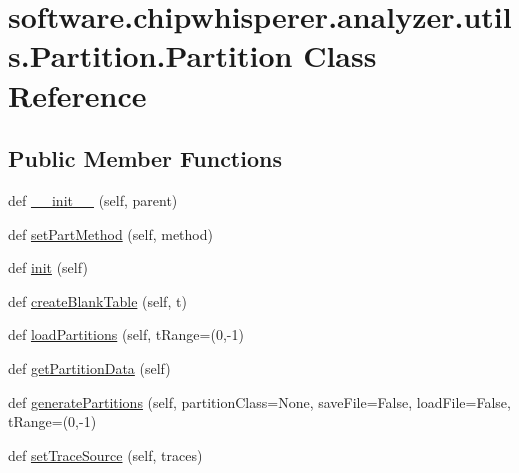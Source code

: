 \hypertarget{classsoftware_1_1chipwhisperer_1_1analyzer_1_1utils_1_1Partition_1_1Partition}{}\section{software.\+chipwhisperer.\+analyzer.\+utils.\+Partition.\+Partition Class Reference}
\label{classsoftware_1_1chipwhisperer_1_1analyzer_1_1utils_1_1Partition_1_1Partition}
\subsection*{Public Member Functions}
\begin{DoxyCompactItemize}
\item 
def \hyperlink{classsoftware_1_1chipwhisperer_1_1analyzer_1_1utils_1_1Partition_1_1Partition_a55aa100e00d71c01c67099e41a0db41f}{\+\_\+\+\_\+init\+\_\+\+\_\+} (self, parent)
\item 
def \hyperlink{classsoftware_1_1chipwhisperer_1_1analyzer_1_1utils_1_1Partition_1_1Partition_ae704605c5cab887f0353518d0b1f4310}{set\+Part\+Method} (self, method)
\item 
def \hyperlink{classsoftware_1_1chipwhisperer_1_1analyzer_1_1utils_1_1Partition_1_1Partition_aeea2c891f787b358435a22db73a3e71b}{init} (self)
\item 
def \hyperlink{classsoftware_1_1chipwhisperer_1_1analyzer_1_1utils_1_1Partition_1_1Partition_ab1059540a7484b4cb1d38568aac9a4ce}{create\+Blank\+Table} (self, t)
\item 
def \hyperlink{classsoftware_1_1chipwhisperer_1_1analyzer_1_1utils_1_1Partition_1_1Partition_a25bf9a8e5bffb48597af03eed3e88fb8}{load\+Partitions} (self, t\+Range=(0,-\/1)
\item 
def \hyperlink{classsoftware_1_1chipwhisperer_1_1analyzer_1_1utils_1_1Partition_1_1Partition_ad6874d3a945e0aade9703c5e775dd16e}{get\+Partition\+Data} (self)
\item 
def \hyperlink{classsoftware_1_1chipwhisperer_1_1analyzer_1_1utils_1_1Partition_1_1Partition_a099057c7cd1001eafe791e7b4bdd5dda}{generate\+Partitions} (self, partition\+Class=None, save\+File=False, load\+File=False, t\+Range=(0,-\/1)
\item 
def \hyperlink{classsoftware_1_1chipwhisperer_1_1analyzer_1_1utils_1_1Partition_1_1Partition_a0df47ea318dd5239da86d1dc5ed5ee4a}{set\+Trace\+Source} (self, traces)
\end{DoxyCompactItemize}
